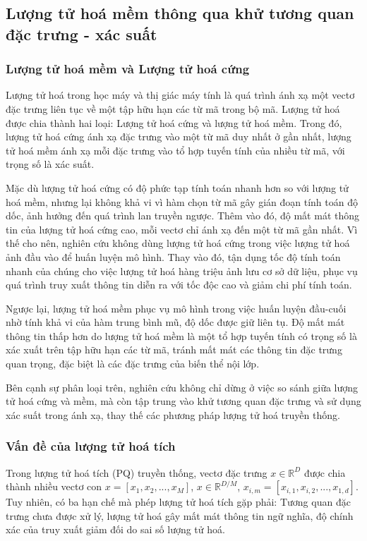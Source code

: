 \subsection{Lượng tử hoá mềm thông qua khử tương quan đặc trưng - xác suất}

\subsubsection{Lượng tử hoá mềm và Lượng tử hoá cứng}
Lượng tử hoá trong học máy và thị giác máy tính là quá trình ánh xạ một vectơ đặc trưng liên tục về một tập hữu hạn các từ mã trong bộ mã. Lượng tử hoá được chia thành hai loại: Lượng tử hoá cứng và lượng tử hoá mềm. Trong đó, lượng tử hoá cứng ánh xạ đặc trưng vào một từ mã duy nhất ở gần nhất, lượng tử hoá mềm ánh xạ mỗi  đặc trưng vào tổ hợp tuyến tính của nhiều từ mã, với trọng số là xác suất.

Mặc dù lượng tử hoá cứng có độ phức tạp tính toán nhanh hơn so với lượng tử hoá mềm, nhưng lại không khả vi vì hàm chọn từ mã gây gián đoạn tính toán độ dốc, ảnh hưởng đến quá trình lan truyền ngược. Thêm vào đó, độ mất mát thông tin của lượng tử hoá cứng cao, mỗi vectơ chỉ ánh xạ đến một từ mã gần nhất. Vì thế cho nên, nghiên cứu không dùng lượng tử hoá cứng trong việc lượng tử hoá ảnh đầu vào để huấn luyện mô hình. Thay vào đó, tận dụng tốc độ tính toán nhanh của chúng cho việc lượng tử hoá hàng triệu ảnh lưu cơ sở dữ liệu, phục vụ quá trình truy xuất thông tin diễn ra với tốc độc cao và giảm chi phí tính toán.

Ngược lại, lượng tử hoá mềm phục vụ mô hình trong việc huấn luyện đầu-cuối nhờ tính khả vi của hàm trung bình mũ, độ dốc được giữ liên tụ. Độ mất mát thông tin thấp hơn do lượng tử hoá mềm là một tổ hợp tuyến tính có trọng số là xác xuất trên tập hữu hạn các từ mã, tránh mất mát các thông tin đặc trưng quan trọng, đặc biệt là các đặc trưng của biến thể nội lớp.

Bên cạnh sự phân loại trên, nghiên cứu không chỉ dừng ở việc so sánh giữa lượng tử hoá cứng và mềm, mà còn tập trung vào khử tương quan đặc trưng và sử dụng xác suất trong ánh xạ, thay thế các phương pháp lượng tử hoá truyền thống.

\subsubsection{Vấn đề của lượng tử hoá tích} 
Trong lượng tử hoá tích (PQ) truyền thống, vectơ đặc trưng $x \in \mathbb{R}^D$ được chia thành nhiều vectơ con $x = [x_1, x_2,...,x_M]$, $x \in \mathbb{R}^{D/M}$, $x_{i,m} = [x_{i,1}, x_{i,2},...,x_{1,d}]$. Tuy nhiên, có ba hạn chế mà phép lượng tử hoá tích gặp phải: Tương quan đặc trưng chưa được xử lý, lượng tử hoá gây mất mát thông tin ngữ nghĩa, độ chính xác của truy xuất giảm đối do sai số lượng tử hoá. 

